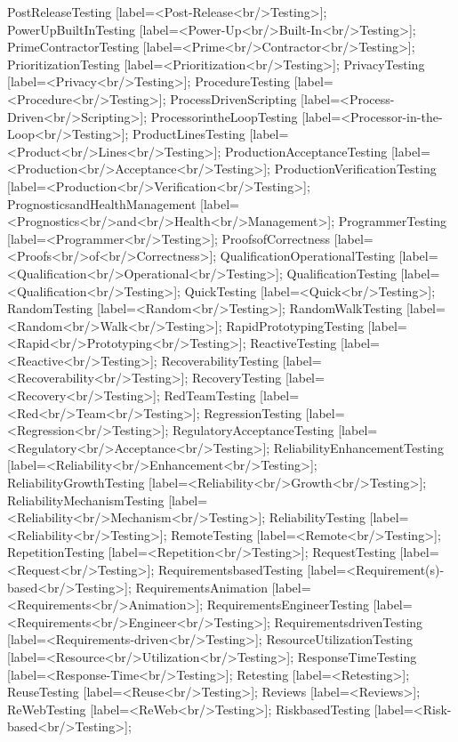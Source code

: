 \documentclass{article}
\begin{document}
{PostReleaseTesting [label=<Post-Release<br/>Testing>];
PowerUpBuiltInTesting [label=<Power-Up<br/>Built-In<br/>Testing>];
PrimeContractorTesting [label=<Prime<br/>Contractor<br/>Testing>];
PrioritizationTesting [label=<Prioritization<br/>Testing>];
PrivacyTesting [label=<Privacy<br/>Testing>];
ProcedureTesting [label=<Procedure<br/>Testing>];
ProcessDrivenScripting [label=<Process-Driven<br/>Scripting>];
ProcessorintheLoopTesting [label=<Processor-in-the-Loop<br/>Testing>];
ProductLinesTesting [label=<Product<br/>Lines<br/>Testing>];
ProductionAcceptanceTesting [label=<Production<br/>Acceptance<br/>Testing>];
ProductionVerificationTesting [label=<Production<br/>Verification<br/>Testing>];
PrognosticsandHealthManagement [label=<Prognostics<br/>and<br/>Health<br/>Management>];
ProgrammerTesting [label=<Programmer<br/>Testing>];
ProofsofCorrectness [label=<Proofs<br/>of<br/>Correctness>];
QualificationOperationalTesting [label=<Qualification<br/>Operational<br/>Testing>];
QualificationTesting [label=<Qualification<br/>Testing>];
QuickTesting [label=<Quick<br/>Testing>];
RandomTesting [label=<Random<br/>Testing>];
RandomWalkTesting [label=<Random<br/>Walk<br/>Testing>];
RapidPrototypingTesting [label=<Rapid<br/>Prototyping<br/>Testing>];
ReactiveTesting [label=<Reactive<br/>Testing>];
RecoverabilityTesting [label=<Recoverability<br/>Testing>];
RecoveryTesting [label=<Recovery<br/>Testing>];
RedTeamTesting [label=<Red<br/>Team<br/>Testing>];
RegressionTesting [label=<Regression<br/>Testing>];
RegulatoryAcceptanceTesting [label=<Regulatory<br/>Acceptance<br/>Testing>];
ReliabilityEnhancementTesting [label=<Reliability<br/>Enhancement<br/>Testing>];
ReliabilityGrowthTesting [label=<Reliability<br/>Growth<br/>Testing>];
ReliabilityMechanismTesting [label=<Reliability<br/>Mechanism<br/>Testing>];
ReliabilityTesting [label=<Reliability<br/>Testing>];
RemoteTesting [label=<Remote<br/>Testing>];
RepetitionTesting [label=<Repetition<br/>Testing>];
RequestTesting [label=<Request<br/>Testing>];
RequirementsbasedTesting [label=<Requirement(s)-based<br/>Testing>];
RequirementsAnimation [label=<Requirements<br/>Animation>];
RequirementsEngineerTesting [label=<Requirements<br/>Engineer<br/>Testing>];
RequirementsdrivenTesting [label=<Requirements-driven<br/>Testing>];
ResourceUtilizationTesting [label=<Resource<br/>Utilization<br/>Testing>];
ResponseTimeTesting [label=<Response-Time<br/>Testing>];
Retesting [label=<Retesting>];
ReuseTesting [label=<Reuse<br/>Testing>];
Reviews [label=<Reviews>];
ReWebTesting [label=<ReWeb<br/>Testing>];
RiskbasedTesting [label=<Risk-based<br/>Testing>];
}
\end{document}
